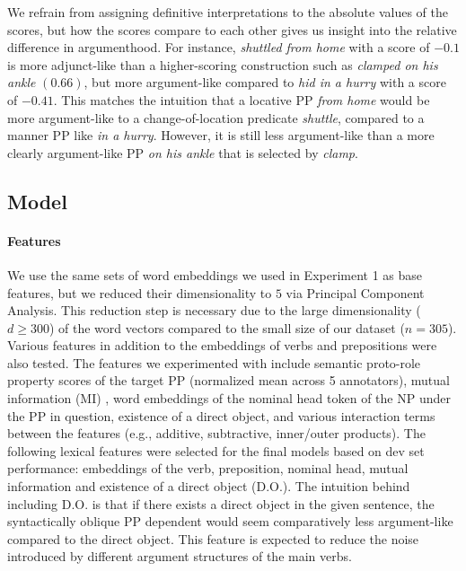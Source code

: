 \documentclass[letterpaper]{article} %
\begin{document}
\noindent We refrain from assigning definitive interpretations to the absolute values of the scores, but how the scores compare to each other gives us insight into the relative difference in argumenthood. For instance, \textit{shuttled from home} with a score of $-0.1$ is more adjunct-like than a higher-scoring construction such as \textit{clamped on his ankle} $(0.66)$, but more argument-like compared to \textit{hid in a hurry} with a score of $-0.41$. This matches the intuition that a locative PP \textit{from home} would be more argument-like to a change-of-location predicate \textit{shuttle}, compared to a manner PP like \textit{in a hurry}. However, it is still less argument-like than a more clearly argument-like PP \textit{on his ankle} that is selected by \textit{clamp}. 


\subsection{Model}
\label{ex2:model}


\paragraph{Features}
We use the same sets of word embeddings we used in Experiment 1 as base features, but we reduced their dimensionality to $5$ via Principal Component Analysis. This reduction step is necessary due to the large dimensionality ($d \ge 300$) of the word vectors compared to the small size of our dataset ($n=305$).  Various features in addition to the embeddings of verbs and prepositions were also tested. The features we experimented with include semantic proto-role property scores \cite{reisinger2015semantic} of the target PP (normalized mean across 5 annotators), mutual information (MI) \cite{aldezabal2002learning}, word embeddings of the nominal head token of the NP under the PP in question, existence of a direct object, and various interaction terms between the features (e.g., additive, subtractive, inner/outer products). The following lexical features were selected for the final models based on dev set performance: embeddings of the verb, preposition, nominal head, mutual information and existence of a direct object (D.O.). The intuition behind including D.O. is that if there exists a direct object in the given sentence, the syntactically oblique PP dependent would seem comparatively less argument-like compared to the direct object. This feature is expected to reduce the noise introduced by different argument structures of the main verbs.
\end{document}
